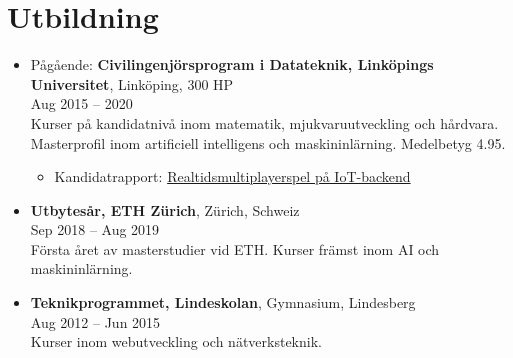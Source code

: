 \documentclass[12pt]{article}
\newcommand{\text}[2]{#2}
\newcommand{\text}[2]{#1}
\begin{document}
\section*{\text{Education}{Utbildning}}
\begin{itemize}
    \item \text{
            In progress: \textbf{Master programme in Computer Science and Engineering (Swedish Civilingenjörsprogram), Linköping University}, Linköping, 300 ECTS\\
        }{
            Pågående: \textbf{Civilingenjörsprogram i Datateknik, Linköpings Universitet}, Linköping, 300 HP\\
        }
        Aug 2015 -- 2020\\
        \text{
            Bachelor courses in mathematics, software development and hardware. Master focused on artificial intelligence and machine learning.
        }{
            Kurser på kandidatnivå inom matematik, mjukvaruutveckling och hårdvara. Masterprofil inom artificiell intelligens och maskininlärning. Medelbetyg 4.95.
        }
        \begin{itemize}
            \item \text{
                    Bachelor thesis: \href{http://urn.kb.se/resolve?urn=urn:nbn:se:liu:diva-149042}{Real-time Multiplayer Game on IoT-backend}
                }{
                    Kandidatrapport: \href{http://urn.kb.se/resolve?urn=urn:nbn:se:liu:diva-149042}{Realtidsmultiplayerspel på IoT-backend}
                }
        \end{itemize}

    \item \text{
            \textbf{Exchange Year, ETH Zürich}, Zürich, Switzerland\\
        }{
            \textbf{Utbytesår, ETH Zürich}, Zürich, Schweiz\\
        }
        Sep 2018 -- Aug 2019\\
        \text{
            First year of my master as an exchange student at ETH. Courses mainly in AI and machine learning.
        }{
            Första året av masterstudier vid ETH. Kurser främst inom AI och maskininlärning.
        }

    \item \text{
            \textbf{Technology Program, Lindeskolan}, Upper secondary school, Lindesberg\\
        }{
            \textbf{Teknikprogrammet, Lindeskolan}, Gymnasium, Lindesberg\\
        }
        Aug 2012 -- Jun 2015\\
        \text{
            Courses in web development and network technologies.
        }{
            Kurser inom webutveckling och nätverksteknik.
        }

\end{itemize}
\end{document}
